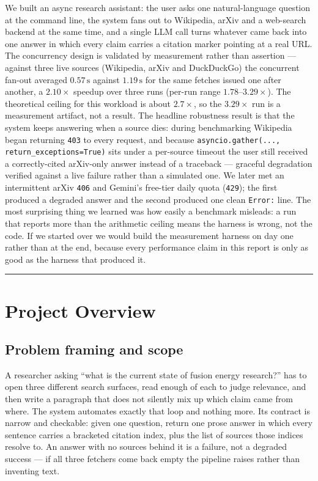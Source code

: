 \documentclass[11pt,a4paper]{article}
\begin{document}
We built an async research assistant: the user asks one natural-language question at the command
line, the system fans out to Wikipedia, arXiv and a web-search backend at the same time, and a
single LLM call turns whatever came back into one answer in which every claim carries a citation
marker pointing at a real URL. The concurrency design is validated by measurement rather than
assertion --- against three live sources (Wikipedia, arXiv and DuckDuckGo) the concurrent fan-out
averaged $0.57\,\mathrm{s}$ against $1.19\,\mathrm{s}$ for the same fetches issued one after
another, a $2.10\times$ speedup over three runs (per-run range $1.78$--$3.29\times$). The
theoretical ceiling for this workload is about $2.7\times$, so the $3.29\times$ run is a
measurement artifact, not a result. The headline robustness result is that the system keeps
answering when a source dies: during benchmarking Wikipedia began returning \texttt{403} to every
request, and because \texttt{asyncio.gather(..., return\_exceptions=True)} sits under a per-source
timeout the user still received a correctly-cited arXiv-only answer instead of a traceback ---
graceful degradation verified against a live failure rather than a simulated one. We later met an
intermittent arXiv \texttt{406} and Gemini's free-tier daily quota (\texttt{429}); the first
produced a degraded answer and the second produced one clean \texttt{Error:} line. The most
surprising thing we learned was how easily a benchmark misleads: a run that reports more than the
arithmetic ceiling means the harness is wrong, not the code. If we started over we would build the
measurement harness on day one rather than at the end, because every performance claim in this
report is only as good as the harness that produced it.

\tableofcontents
\vspace{0.6em}\hrule\vspace{0.4em}

\section{Project Overview}

\subsection{Problem framing and scope}

A researcher asking ``what is the current state of fusion energy research?'' has to open three
different search surfaces, read enough of each to judge relevance, and then write a paragraph
that does not silently mix up which claim came from where. The system automates exactly that
loop and nothing more. Its contract is narrow and checkable: given one question, return one
prose answer in which every sentence carries a bracketed citation index, plus the list of
sources those indices resolve to. An answer with no sources behind it is a failure, not a
degraded success --- if all three fetchers come back empty the pipeline raises rather than
inventing text.
\end{document}
